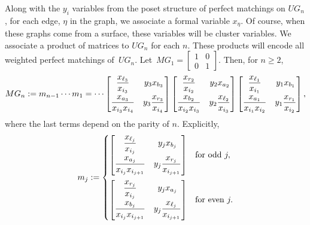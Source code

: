 \documentclass[11pt]{article}
\numberwithin{equation}{section}
\begin{document}
Along with the $y_i$ variables from the poset structure of perfect matchings on $UG_n$, for each edge, $\eta$ in the graph, we associate a formal variable $x_\eta$. Of course, when these graphs come from a surface, these variables will be cluster variables. We associate a product of matrices to $UG_n$ for each $n$. These products will encode all weighted perfect matchings of~$UG_n$. Let~$MG_1 = \left[\begin{smallmatrix} 1 &0 \\ 0 & 1 \end{smallmatrix}\right]$. Then, for $n \geq 2$,
\[
MG_n := m_{n-1}\cdots m_1 = \cdots \begin{bmatrix} \dfrac{x_{\ell_3}}{x_{i_3}} & y_3 x_{b_3} \vspace{1mm}\\ \dfrac{x_{a_3}}{x_{i_3}x_{i_4}} & y_3 \dfrac{x_{r_3}}{x_{i_4}} \end{bmatrix} \begin{bmatrix}\dfrac{x_{r_2}}{x_{i_2}} & y_2 x_{a_2} \vspace{1mm}\\ \dfrac{x_{b_2}}{x_{i_2}x_{i_3}} & y_2 \dfrac{x_{\ell_2}}{x_{i_3}} \end{bmatrix} \begin{bmatrix} \dfrac{x_{\ell_1}}{x_{i_1}} & y_1 x_{b_1} \vspace{1mm}\\ \dfrac{x_{a_1}}{x_{i_1}x_{i_2}} & y_1 \dfrac{x_{r_1}}{x_{i_2}} \end{bmatrix},
\]
where the last terms depend on the parity of $n$. Explicitly,
\begin{gather*}
 m_j := \begin{cases}
 \begin{bmatrix} \dfrac{x_{\ell_j}}{x_{i_j}} & y_jx_{b_j} \vspace{1mm}\\ \dfrac{x_{a_j}}{x_{i_j}x_{i_{j+1}}} & y_j\dfrac{x_{r_j}}{x_{i_{j+1}}} \end{bmatrix} & \text{for odd } j, \vspace{2mm} \\
\begin{bmatrix} \dfrac{x_{r_j}}{x_{i_j}} & y_jx_{a_j} \vspace{1mm}\\ \dfrac{x_{b_j}}{x_{i_j}x_{i_{j+1}}} & y_j\dfrac{x_{\ell_j}}{x_{i_{j+1}}} \end{bmatrix} & \text{for even }j.
 \end{cases}
\end{gather*}
\end{document}
